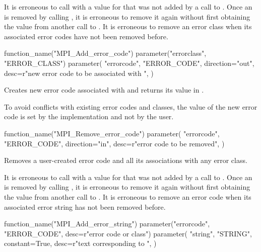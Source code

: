 It is erroneous to call  with a value for
 that was not added by a call to . Once an
 is removed by calling , it is erroneous to
remove it again without first obtaining the value from another call to .
%
It is erroneous to remove an error class when its associated error codes have not been removed before.

\begin{mpi-binding}
    function_name("MPI_Add_error_code")
    parameter("errorclass", "ERROR_CLASS")
    parameter(
        "errorcode",
        "ERROR_CODE",
        direction="out",
        desc=r"new error code to be associated with ",
    )
\end{mpi-binding}

Creates new error code associated with
 and returns its value in .

\begin{rationale}
To avoid conflicts with existing error codes and classes, the value
of the new error code is set by the implementation and not by the
user. 
\end{rationale}


\begin{mpi-binding}
    function_name("MPI_Remove_error_code")
    parameter(
        "errorcode",
        "ERROR_CODE",
        direction="in",
        desc=r"error code to be removed",
    )
\end{mpi-binding}

Removes a user-created error code and all its associations with any error class.

It is erroneous to call  with a value for
 that was not added by a call to . Once an
 is removed by calling , it is erroneous to
remove it again without first obtaining the value from another call to .
%
It is erroneous to remove an error code when its associated error string has not been removed before.

\begin{mpi-binding}
    function_name("MPI_Add_error_string")
    parameter("errorcode", "ERROR_CODE", desc=r"error code or class")
    parameter(
        "string",
        "STRING",
        constant=True,
        desc=r"text corresponding to ",
    )
\end{mpi-binding}

